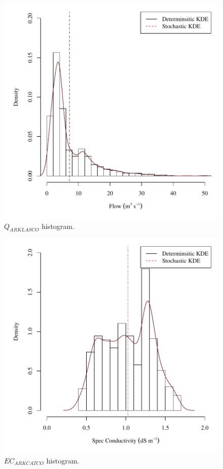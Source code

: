 \begin{center}
\begin{figure}[htbp]
	\includegraphics[width=6in]{"Figures/Results_USR/V density qout"}
	\caption{$Q_{ARKLASCO}$ histogram.}
\end{figure}
\end{center}
\newpage

\begin{center}
\begin{figure}[htbp]
	\includegraphics[width=6in]{"Figures/Results_USR/V density ecin"}
	\caption{$EC_{ARKCATCO}$ histogram.}
\end{figure}
\end{center}
\newpage

